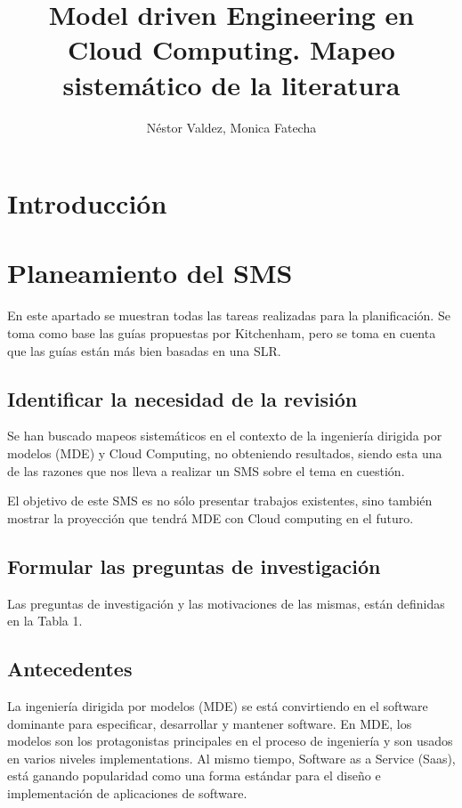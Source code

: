 \documentclass{llncs}
\begin{document}
\title{Model driven Engineering en Cloud Computing. Mapeo sistemático de la literatura}

\author{Néstor Valdez, Monica Fatecha}
\maketitle


\section{Introducción}\label{sec:Introduction}
\section{Planeamiento del SMS}\label{sec:Planning}
En este apartado se muestran todas las tareas realizadas para la planificación. Se toma como base las guías propuestas por
Kitchenham\cite{slr}, pero se toma en cuenta que las guías están más bien basadas en una SLR.
\subsection{Identificar la necesidad de la revisión}
Se han buscado mapeos sistemáticos en el contexto de la ingeniería dirigida por modelos (MDE) y Cloud Computing, no obteniendo
resultados, siendo esta una de las razones que nos lleva a realizar un SMS sobre el tema en cuestión.

El objetivo de este SMS es no sólo presentar trabajos existentes, sino también mostrar la proyección que tendrá MDE con Cloud computing
en el futuro.
\subsection{Formular las preguntas de investigación}
Las preguntas de investigación y las motivaciones de las mismas, están definidas en la Tabla 1.

\subsection{Antecedentes}
La ingeniería dirigida por modelos (MDE) se está convirtiendo en el software dominante para especificar,
desarrollar y mantener software. En MDE, los modelos son los protagonistas principales en el proceso
de ingeniería y son usados en varios niveles implementations.
Al mismo tiempo, Software as a Service (Saas), está ganando popularidad como una forma estándar para el diseño
e implementación de aplicaciones de software.
\end{document}
